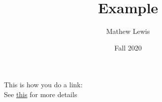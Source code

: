 \documentclass{article}
\title{Example}
\author{Mathew Lewis}\date{Fall 2020}
\begin{document}
\bigbreak\noindent
This is how you do a link:\\
See \href{https://www.overleaf.com/learn/latex/Hyperlinks}{this}
for more details
\end{document}
